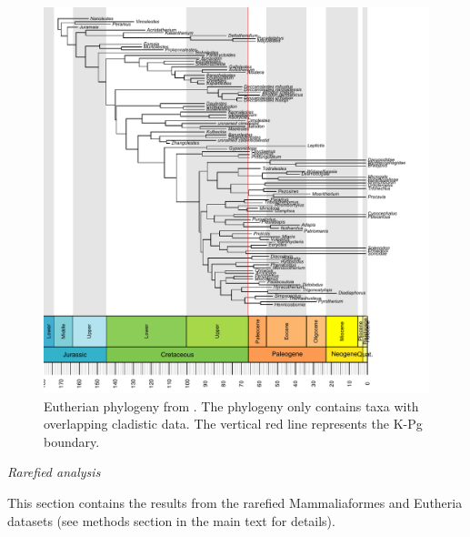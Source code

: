 \documentclass[12pt,letterpaper]{article}
\renewcommand{\subsection}[1]{%
\bigskip
\begin{center}
\begin{large}
\normalfont\itshape #1
\end{large}
\end{center}}
\begin{document}
\begin{figure}[!htbp]
\centering
    \includegraphics[keepaspectratio=true]{Figures/Beck_tree.pdf}
\caption{Eutherian phylogeny from \cite{beckancient2014}. The phylogeny only contains taxa with overlapping cladistic data. The vertical red line represents the K-Pg boundary.}
\end{figure}

\subsection{Rarefied analysis}
This section contains the results from the rarefied Mammaliaformes and Eutheria datasets (see methods section in the main text for details).
\end{document}
